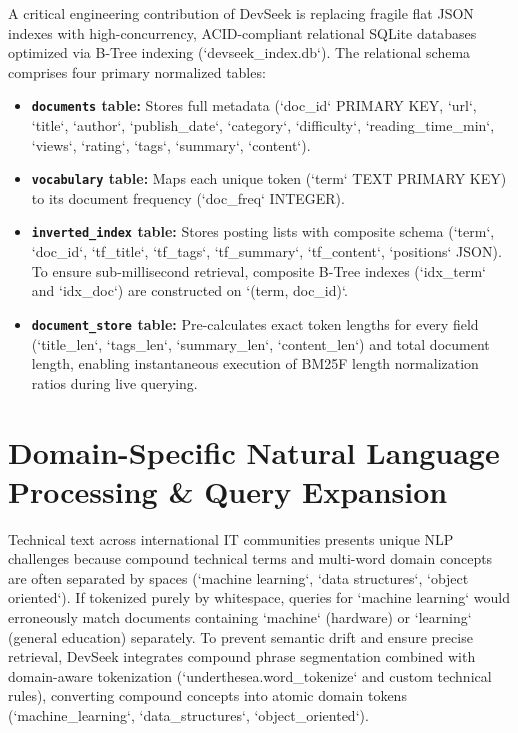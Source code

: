 \documentclass[12pt,a4paper]{article}
\begin{document}
A critical engineering contribution of DevSeek is replacing fragile flat JSON indexes with high-concurrency, ACID-compliant relational SQLite databases optimized via B-Tree indexing (`devseek\_index.db`). The relational schema comprises four primary normalized tables:
\begin{itemize}
    \item \textbf{\texttt{documents} table:} Stores full metadata (`doc\_id` PRIMARY KEY, `url`, `title`, `author`, `publish\_date`, `category`, `difficulty`, `reading\_time\_min`, `views`, `rating`, `tags`, `summary`, `content`).
    \item \textbf{\texttt{vocabulary} table:} Maps each unique token (`term` TEXT PRIMARY KEY) to its document frequency (`doc\_freq` INTEGER).
    \item \textbf{\texttt{inverted\_index} table:} Stores posting lists with composite schema (`term`, `doc\_id`, `tf\_title`, `tf\_tags`, `tf\_summary`, `tf\_content`, `positions` JSON). To ensure sub-millisecond retrieval, composite B-Tree indexes (`idx\_term` and `idx\_doc`) are constructed on `(term, doc\_id)`.
    \item \textbf{\texttt{document\_store} table:} Pre-calculates exact token lengths for every field (`title\_len`, `tags\_len`, `summary\_len`, `content\_len`) and total document length, enabling instantaneous execution of BM25F length normalization ratios during live querying.
\end{itemize}

\section{Domain-Specific Natural Language Processing \& Query Expansion}

Technical text across international IT communities presents unique NLP challenges because compound technical terms and multi-word domain concepts are often separated by spaces (`machine learning`, `data structures`, `object oriented`). If tokenized purely by whitespace, queries for `machine learning` would erroneously match documents containing `machine` (hardware) or `learning` (general education) separately. To prevent semantic drift and ensure precise retrieval, DevSeek integrates compound phrase segmentation combined with domain-aware tokenization (`underthesea.word\_tokenize` and custom technical rules), converting compound concepts into atomic domain tokens (`machine\_learning`, `data\_structures`, `object\_oriented`).
\end{document}
